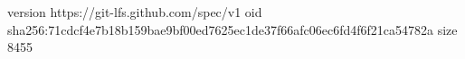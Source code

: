 version https://git-lfs.github.com/spec/v1
oid sha256:71cdcf4e7b18b159bae9bf00ed7625ec1de37f66afc06ec6fd4f6f21ca54782a
size 8455
